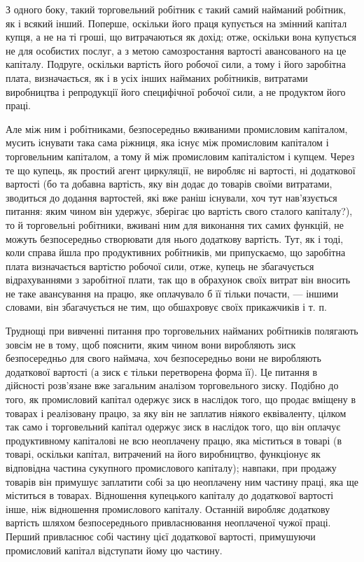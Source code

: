 З одного боку, такий торговельний робітник є такий самий
найманий робітник, як і всякий інший. Поперше, оскільки його
праця купується на змінний капітал купця, а не на ті гроші, що
витрачаються як дохід; отже, оскільки вона купується не для
особистих послуг, а з метою самозростання вартості авансованого
на це капіталу. Подруге, оскільки вартість його робочої
сили, а тому і його заробітна плата, визначається, як і в усіх
інших найманих робітників, витратами виробництва і репродукції
його специфічної робочої сили, а не продуктом його праці.

Але між ним і робітниками, безпосередньо вживаними промисловим
капіталом, мусить існувати така сама ріжниця, яка існує
між промисловим капіталом і торговельним капіталом, а тому й
між промисловим капіталістом і купцем. Через те що купець, як
простий агент циркуляції, не виробляє ні вартості, ні додаткової
вартості (бо та добавна вартість, яку він додає до товарів своїми
витратами, зводиться до додання вартостей, які вже раніш існували,
хоч тут нав’язується питання: яким чином він удержує, зберігає
цю вартість свого сталого капіталу?), то й торговельні робітники,
вживані ним для виконання тих самих функцій, не можуть
безпосередньо створювати для нього додаткову вартість. Тут, як
і тоді, коли справа йшла про продуктивних робітників, ми припускаємо,
що заробітна плата визначається вартістю робочої сили,
отже, купець не збагачується відрахуваннями з заробітної плати,
так що в обрахунок своїх витрат він вносить не таке авансування
на працю, яке оплачувало б її тільки почасти, — іншими словами,
він збагачується не тим, що обшахровує своїх прикажчиків і т. п.

Труднощі при вивченні питання про торговельних найманих
робітників полягають зовсім не в тому, щоб пояснити, яким чином
вони виробляють зиск безпосередньо для свого наймача, хоч
безпосередньо вони не виробляють додаткової вартості (а зиск
є тільки перетворена форма її). Це питання в дійсності розв’язане
вже загальним аналізом торговельного зиску. Подібно до
того, як промисловий капітал одержує зиск в наслідок того,
що продає вміщену в товарах і реалізовану працю, за яку він
не заплатив ніякого еквіваленту, цілком так само і торговельний
капітал одержує зиск в наслідок того, що він оплачує продуктивному
капіталові не всю неоплачену працю, яка міститься
в товарі (в товарі, оскільки капітал, витрачений на його виробництво,
функціонує як відповідна частина сукупного промислового
капіталу); навпаки, при продажу товарів він примушує
заплатити собі за цю неоплачену ним частину праці, яка ще
міститься в товарах. Відношення купецького капіталу до додаткової
вартості інше, ніж відношення промислового капіталу.
Останній виробляє додаткову вартість шляхом безпосереднього
привласнювання неоплаченої чужої праці. Перший привласнює
собі частину цієї додаткової вартості, примушуючи промисловий
капітал відступати йому цю частину.

